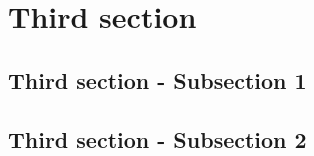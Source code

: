 \section{Third section} \label{sec3:title}
\lipsum[1]

\subsection{Third section - Subsection 1}
\lipsum[1]

\subsection{Third section - Subsection 2}
\lipsum[1]
